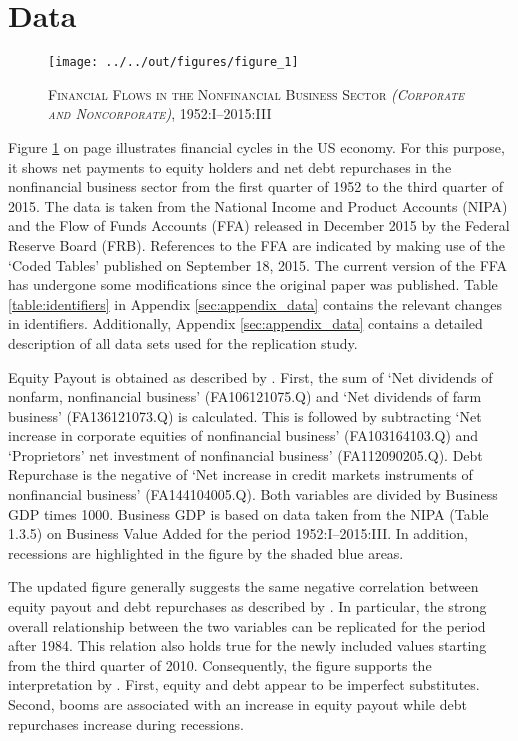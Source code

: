 \section{Data}
\label{sec:data}

\begin{figure}[t]
    
    \centering

    \texttt{[image: ../../out/figures/figure\_1]}

    \caption{\textsc{Financial Flows in the Nonfinancial Business Sector \textit{(Corporate and Noncorporate)}}, 1952:I--2015:III}
    
    \label{fig:figure_1}

\end{figure}

Figure \ref{fig:figure_1} on page \pageref{fig:figure_1} illustrates financial cycles in the US economy. For this purpose, it shows net payments to equity holders and net debt repurchases in the nonfinancial business sector from the first quarter of 1952 to the third quarter of 2015. The data is taken from the National Income and Product Accounts (NIPA) and the Flow of Funds Accounts (FFA) released in December 2015 by the Federal Reserve Board (FRB). References to the FFA are indicated by making use of the ‘Coded Tables’ published on September 18, 2015. The current version of the FFA has undergone some modifications since the original paper was published. Table \ref{table:identifiers} in Appendix \ref{sec:appendix_data} contains the relevant changes in identifiers. Additionally, Appendix \ref{sec:appendix_data} contains a detailed description of all data sets used for the replication study.

Equity Payout is obtained as described by \citeauthor{JERMANNfinancial}. First, the sum of ‘Net dividends of nonfarm, nonfinancial business’ (FA106121075.Q) and ‘Net dividends of farm business’ (FA136121073.Q) is calculated. This is followed by subtracting ‘Net increase in corporate equities of nonfinancial business’ (FA103164103.Q) and ‘Proprietors’ net investment of nonfinancial business’ (FA112090205.Q). Debt Repurchase is the negative of ‘Net increase in credit markets instruments of nonfinancial business’ (FA144104005.Q). Both variables are divided by Business GDP times 1000. Business GDP is based on data taken from the NIPA (Table 1.3.5) on Business Value Added for the period 1952:I--2015:III. In addition, recessions are highlighted in the figure by the shaded blue areas.

The updated figure generally suggests the same negative correlation between equity payout and debt repurchases as described by \citeauthor{JERMANNfinancial}. In particular, the strong overall relationship between the two variables can be replicated for the period after 1984. This relation also holds true for the newly included values starting from the third quarter of 2010. 
Consequently, the figure supports the interpretation by \citeauthor{JERMANNfinancial}. First, equity and debt appear to be imperfect substitutes. Second, booms are associated with an increase in equity payout while debt repurchases increase during recessions.
